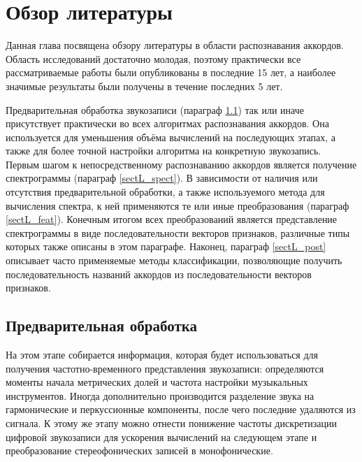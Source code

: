 \chapter{Обзор литературы} \label{chaptL}

Данная глава посвящена обзору литературы в области распознавания аккордов.
Область исследований достаточно молодая, поэтому практически все рассматриваемые
работы были опубликованы в последние 15 лет, а наиболее значимые результаты
были получены в течение последних 5 лет.

Предварительная обработка звукозаписи (параграф \ref{sectL_prelim}) так или
иначе присутствует практически во всех алгоритмах распознавания аккордов. Она
используется для уменьшения объёма вычислений на последующих этапах, а также
для более точной настройки алгоритма на конкретную звукозапись. Первым шагом к
непосредственному распознаванию аккордов является получение спектрограммы
(параграф \ref{sectL_spect}). В зависимости от наличия или отсутствия
предварительной обработки, а также используемого метода для вычисления спектра,
к ней применяются те или иные преобразования (параграф \ref{sectL_feat}).
Конечным итогом всех преобразований является представление спектрограммы в виде
последовательности векторов признаков, различные типы которых также описаны в
этом параграфе. Наконец, параграф \ref{sectL_post} описывает часто применяемые
методы классификации, позволяющие получить последовательность названий аккордов
из последовательности векторов признаков.

\section{Предварительная обработка} \label{sectL_prelim}

На этом этапе собирается информация, которая будет использоваться для получения
частотно-временного представления звукозаписи: определяются моменты начала
метрических долей и частота настройки музыкальных инструментов. Иногда
дополнительно производится разделение звука на гармонические и перкуссионные
компоненты, после чего последние удаляются из сигнала. К этому же этапу можно
отнести понижение частоты дискретизации цифровой звукозаписи для ускорения
вычислений на следующем этапе и преобразование стереофонических записей в
монофонические.

